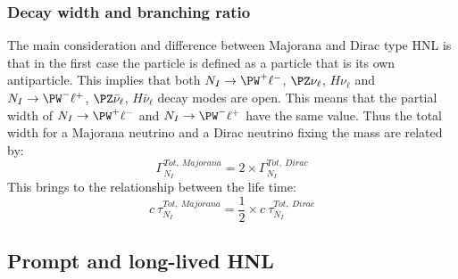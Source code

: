 \subsubsection{Decay width and branching ratio}\label{sec:decay_width}
The main consideration and difference between Majorana and Dirac type HNL is that in the first case the \hnl particle is defined as a particle that is its own antiparticle. This implies that both $N_I\rightarrow \PW^{+}\ell^-$, $\PZ\nu_{\ell}$, $H\nu_{\ell}$ and $N_I\rightarrow \PW^{-}\ell^+$, $\PZ\bar{\nu}_{\ell}$, $H\bar{\nu}_{\ell}$ decay modes are open. This means that the partial width of $N_I\rightarrow \PW^{+}\ell^-$ and $N_I\rightarrow \PW^{-}\ell^+$ have the same value. Thus the total width for a Majorana neutrino and a Dirac neutrino fixing the mass are related by:
\begin{equation}
\label{eq:width}
\Gamma^{Tot, \: Majorana}_{N_{I}} = 2 \times \Gamma^{Tot, \: Dirac}_{N_{I}}
\end{equation}
This brings to the relationship between the life time:
\begin{equation}
\label{eq:lifetime}
c\:\tau^{Tot, \: Majorana}_{N_{I}} = \frac{1}{2} \times c\:\tau^{Tot, \: Dirac}_{N_{I}}
\end{equation}

\subsection{Prompt and long-lived HNL}\label{sec:promptll}

